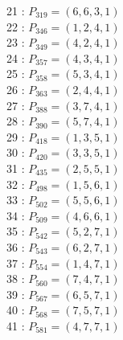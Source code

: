 \documentclass{article}
\begin{document}
{\begin{multicols}{2}
21 : $P_{319}=( 6, 6, 3, 1 )$\\
22 : $P_{346}=( 1, 2, 4, 1 )$\\
23 : $P_{349}=( 4, 2, 4, 1 )$\\
24 : $P_{357}=( 4, 3, 4, 1 )$\\
25 : $P_{358}=( 5, 3, 4, 1 )$\\
26 : $P_{363}=( 2, 4, 4, 1 )$\\
27 : $P_{388}=( 3, 7, 4, 1 )$\\
28 : $P_{390}=( 5, 7, 4, 1 )$\\
29 : $P_{418}=( 1, 3, 5, 1 )$\\
30 : $P_{420}=( 3, 3, 5, 1 )$\\
31 : $P_{435}=( 2, 5, 5, 1 )$\\
32 : $P_{498}=( 1, 5, 6, 1 )$\\
33 : $P_{502}=( 5, 5, 6, 1 )$\\
34 : $P_{509}=( 4, 6, 6, 1 )$\\
35 : $P_{542}=( 5, 2, 7, 1 )$\\
36 : $P_{543}=( 6, 2, 7, 1 )$\\
37 : $P_{554}=( 1, 4, 7, 1 )$\\
38 : $P_{560}=( 7, 4, 7, 1 )$\\
39 : $P_{567}=( 6, 5, 7, 1 )$\\
40 : $P_{568}=( 7, 5, 7, 1 )$\\
41 : $P_{581}=( 4, 7, 7, 1 )$\\
\end{multicols}
}
\end{document}
